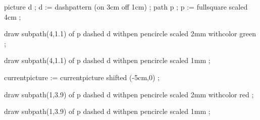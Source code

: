 \startMPpage

    picture d ; d := dashpattern (on 3cm off 1cm) ;
    path    p ; p := fullsquare scaled 4cm ;

    draw
        subpath(4,1.1) of p
        dashed d
        withpen pencircle scaled 2mm
        withcolor green ;

    draw
        subpath(4,1.1) of p
        dashed d
        withpen pencircle scaled 1mm ;

    currentpicture := currentpicture shifted (-5cm,0) ;

    draw
        subpath(1,3.9) of p
        dashed d
        withpen pencircle scaled 2mm
        withcolor red ;

    draw
        subpath(1,3.9) of p
        dashed d
        withpen pencircle scaled 1mm ;

\stopMPpage
